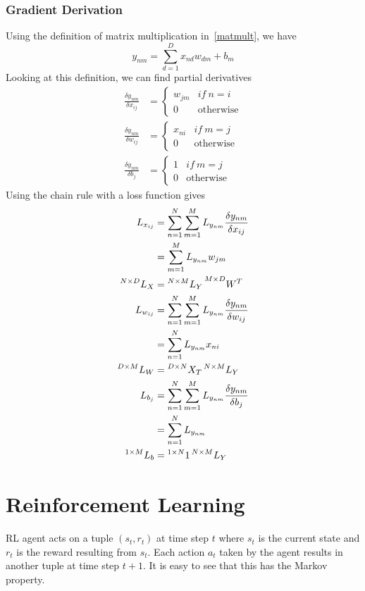 \documentclass{book}
\numberwithin{equation}{subsection}
\begin{document}
\subsection{Gradient Derivation}
Using the definition of matrix multiplication in~\ref{matmult}, we have
\begin{equation}
y_{nm} = \sum_{d=1}^D x_{nd} w_{dm}+b_m
\end{equation}
Looking at this definition, we can find partial derivatives
\begin{align}
    \frac{\delta y_{nm}}{\delta x_{ij}} &= \begin{cases}
        w_{jm} & if\ n=i\\
        0 & \text{otherwise}
    \end{cases}\\
    \frac{\delta y_{nm}}{\delta w_{ij}} &= \begin{cases}
        x_{ni} & if\ m=j\\
        0 & \text{otherwise}
    \end{cases}\\
    \frac{\delta y_{nm}}{\delta b_{j}} &= \begin{cases}
        1 & if\ m=j\\
        0 & \text{otherwise}
    \end{cases}
\end{align}
Using the chain rule with a loss function gives
\begin{align}
    L_{x_{ij}} &= \sum_{n=1}^N\sum_{m=1}^M L_{y_{nm}} \frac{\delta y_{nm}}{\delta x_{ij}}\\
    &= \sum_{m=1}^M L_{y_{nm}} w_{jm}\\
    \prescript{N\times D}{}{L_X} &= \prescript{N\times M}{}{L_Y}\prescript{M\times D}{}{W^T}\\
    L_{w_{ij}} &= \sum_{n=1}^N\sum_{m=1}^M L_{y_{nm}} \frac{\delta y_{nm}}{\delta w_{ij}}\\
    &= \sum_{n=1}^N L_{y_{nm}} x_{ni}\\
    \prescript{D\times M}{}{L_W} &= \prescript{D\times N}{}{X_T}\prescript{N\times M}{}{L_Y}\\
    L_{b_{j}} &= \sum_{n=1}^N\sum_{m=1}^M L_{y_{nm}} \frac{\delta y_{nm}}{\delta b_{j}}\\
    &= \sum_{n=1}^N L_{y_{nm}}\\
    \prescript{1\times M}{}{L_b} &= \prescript{1\times N}{}{1}\prescript{N\times M}{}{L_Y}
\end{align}
\chapter{Reinforcement Learning}
RL agent acts on a tuple $(s_t,r_t)$ at time step $t$ where $s_t$ is the current state and $r_t$ is the reward resulting from $s_t$. Each action $a_t$ taken by the agent results in another tuple at time step $t+1$. It is easy to see that this has the Markov property.
\end{document}
